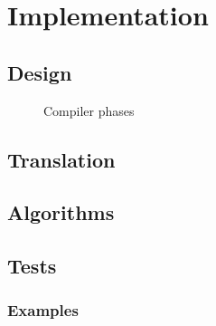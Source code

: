 
\part{Implementation}
\chapter{Design}

\begin{figure}[ht]
	\centering
	\caption{Compiler phases}
	\label{fig:compilerPhase}
\end{figure}



\chapter{Translation}


\chapter{Algorithms}

\chapter{Tests}

\section{Examples}
